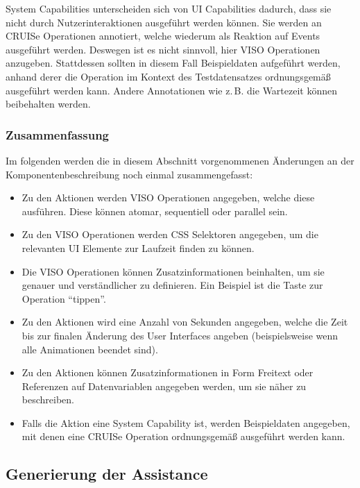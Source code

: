 \documentclass[
	headsepline,
	footsepline,
	fontsize=12pt,
	bibliography=totoc
]{scrbook}
\begin{document}
System Capabilities unterscheiden sich von UI Capabilities dadurch, dass sie nicht durch Nutzerinteraktionen ausgeführt werden können. Sie werden an CRUISe Operationen annotiert, welche wiederum als Reaktion auf Events ausgeführt werden. Deswegen ist es nicht sinnvoll, hier VISO Operationen anzugeben. Stattdessen sollten in diesem Fall Beispieldaten aufgeführt werden, anhand derer die Operation im Kontext des Testdatensatzes ordnungsgemäß ausgeführt werden kann. Andere Annotationen wie z.\,B. die Wartezeit können beibehalten werden.

\subsubsection{Zusammenfassung}

Im folgenden werden die in diesem Abschnitt vorgenommenen Änderungen an der Komponentenbeschreibung noch einmal zusammengefasst:
\begin{itemize}
	\item Zu den Aktionen werden VISO Operationen angegeben, welche diese ausführen. Diese können atomar, sequentiell oder parallel sein.
	\item Zu den VISO Operationen werden CSS Selektoren angegeben, um die relevanten UI Elemente zur Laufzeit finden zu können.
	\item Die VISO Operationen können Zusatzinformationen beinhalten, um sie genauer und verständlicher zu definieren. Ein Beispiel ist die Taste zur Operation \enquote{tippen}.
	\item Zu den Aktionen wird eine Anzahl von Sekunden angegeben, welche die Zeit bis zur finalen Änderung des User Interfaces angeben (beispielsweise wenn alle Animationen beendet sind).
	\item Zu den Aktionen können Zusatzinformationen in Form Freitext oder Referenzen auf Datenvariablen angegeben werden, um sie näher zu beschreiben.
	\item Falls die Aktion eine System Capability ist, werden Beispieldaten angegeben, mit denen eine CRUISe Operation ordnungsgemäß ausgeführt werden kann.
\end{itemize}

\subsection{Generierung der Assistance}
\label{section:konzeption:bedienung:generierung}

\end{document}
